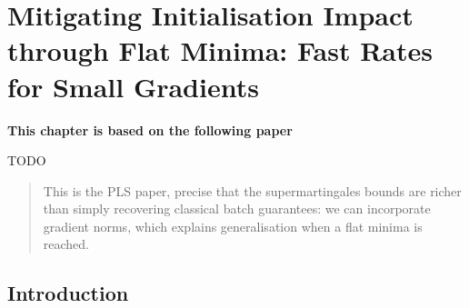 \chapter[Mitigating Initialisation Impact through Flat Minima: Fast Rates for Small Gradients]{Mitigating Initialisation Impact through Flat Minima: Fast Rates for Small Gradients}
\label{chap:gen-flat-minima}
\addchapterlof
\addchapterloe

\vspace{-2.0cm}
\begin{center}
\textbf{This chapter is based on the following paper}\\[-0.1cm]
\end{center}
TODO

\vspace{0.2cm}
\minitoc

\begin{abstract}
\vspace{-0.2cm}
This is the PLS paper, precise that the supermartingales bounds are richer than simply recovering classical batch guarantees: we can incorporate gradient norms, which explains generalisation when a flat minima is reached.
\end{abstract}

\newpage
    
\section{Introduction}

